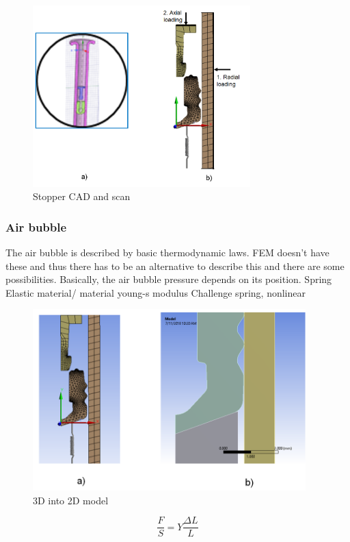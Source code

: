 \begin{figure}[h!]	
	\centering
\includegraphics[height=7cm]{img/meshing.PNG}
   \caption{Stopper CAD and scan}
 \label{fgr:PFS}
\end{figure}


\subsubsection{Air bubble}
The air bubble is described by basic thermodynamic laws. FEM doesn't have these and thus there has to be an alternative to describe this and there are some possibilities. Basically, the air bubble pressure depends on its position.
Spring
Elastic material/ material young-s modulus
Challenge spring, nonlinear


\begin{figure}[h!]	
	\centering
\includegraphics[height=7cm]{img/air.PNG}
   \caption{3D into 2D model}
 \label{fgr:PFS}
\end{figure}

\begin{equation}
\frac{F}{S}=Y\frac{\Delta L}{L}
\end{equation}

\newpage
